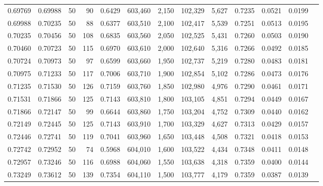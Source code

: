 \begin{tabular}{rrrrrrrrrrrrr}
0.69769 & 0.69988 &    50 &  90 &                                     0.6429 & 603,460 &   2,150 & 102,329 &   5,627 & 0.7235 & 0.0521 & 0.0199 \\
0.69988 & 0.70235 &    50 &  88 &                                     0.6377 & 603,510 &   2,100 & 102,417 &   5,539 & 0.7251 & 0.0513 & 0.0195 \\
0.70235 & 0.70456 &    50 & 108 &                                     0.6835 & 603,560 &   2,050 & 102,525 &   5,431 & 0.7260 & 0.0503 & 0.0190 \\
0.70460 & 0.70723 &    50 & 115 &                                     0.6970 & 603,610 &   2,000 & 102,640 &   5,316 & 0.7266 & 0.0492 & 0.0185 \\
0.70724 & 0.70973 &    50 &  97 &                                     0.6599 & 603,660 &   1,950 & 102,737 &   5,219 & 0.7280 & 0.0483 & 0.0181 \\
0.70975 & 0.71233 &    50 & 117 &                                     0.7006 & 603,710 &   1,900 & 102,854 &   5,102 & 0.7286 & 0.0473 & 0.0176 \\
0.71235 & 0.71530 &    50 & 126 &                                     0.7159 & 603,760 &   1,850 & 102,980 &   4,976 & 0.7290 & 0.0461 & 0.0171 \\
0.71531 & 0.71866 &    50 & 125 &                                     0.7143 & 603,810 &   1,800 & 103,105 &   4,851 & 0.7294 & 0.0449 & 0.0167 \\
0.71866 & 0.72147 &    50 &  99 &                                     0.6644 & 603,860 &   1,750 & 103,204 &   4,752 & 0.7309 & 0.0440 & 0.0162 \\
0.72149 & 0.72445 &    50 & 125 &                                     0.7143 & 603,910 &   1,700 & 103,329 &   4,627 & 0.7313 & 0.0429 & 0.0157 \\
0.72446 & 0.72741 &    50 & 119 &                                     0.7041 & 603,960 &   1,650 & 103,448 &   4,508 & 0.7321 & 0.0418 & 0.0153 \\
0.72742 & 0.72952 &    50 &  74 &                                     0.5968 & 604,010 &   1,600 & 103,522 &   4,434 & 0.7348 & 0.0411 & 0.0148 \\
0.72957 & 0.73246 &    50 & 116 &                                     0.6988 & 604,060 &   1,550 & 103,638 &   4,318 & 0.7359 & 0.0400 & 0.0144 \\
0.73249 & 0.73612 &    50 & 139 &                                     0.7354 & 604,110 &   1,500 & 103,777 &   4,179 & 0.7359 & 0.0387 & 0.0139 \\

\end{tabular}

